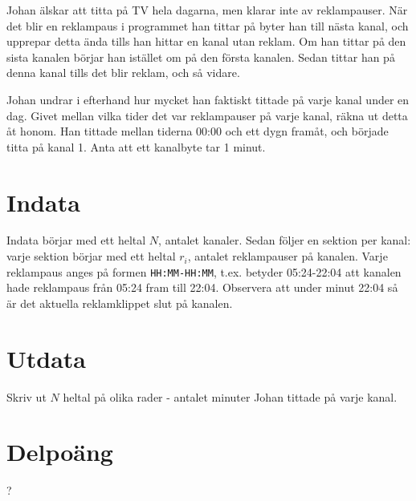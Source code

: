 
Johan älskar att titta på TV hela dagarna, men klarar inte av reklampauser. När det blir en reklampaus i programmet han tittar på byter han till nästa kanal, och upprepar detta ända tills han hittar en kanal utan reklam. Om han tittar på den sista kanalen börjar han istället om på den första kanalen. Sedan tittar han på denna kanal tills det blir reklam, och så vidare.

Johan undrar i efterhand hur mycket han faktiskt tittade på varje kanal under en dag. Givet mellan vilka tider det var reklampauser på varje kanal, räkna ut detta åt honom. Han tittade mellan tiderna 00:00 och ett dygn framåt, och började titta på kanal 1. Anta att ett kanalbyte tar 1 minut.

\section*{Indata}
Indata börjar med ett heltal $N$, antalet kanaler. Sedan följer en sektion per kanal: varje sektion börjar med ett heltal $r_i$, antalet reklampauser på kanalen. Varje reklampaus anges på formen \texttt{HH:MM-HH:MM}, t.ex. betyder 05:24-22:04 att kanalen hade reklampaus från 05:24 fram till 22:04. Observera att under minut 22:04 så är det aktuella reklamklippet slut på kanalen.

\section*{Utdata}
Skriv ut $N$ heltal på olika rader - antalet minuter Johan tittade på varje kanal.

\section*{Delpoäng}
?
